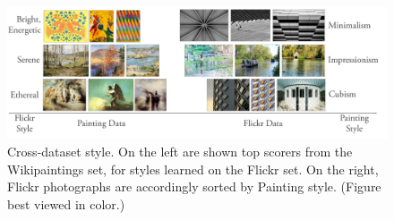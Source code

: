 \begin{figure}[ht]
\centering
\includegraphics[width=.95\linewidth]{../style/figures/style_by_style.pdf}
\caption[Cross-dataset understanding of style demonstrated by applying Wikipaintings-learned classifiers to phoitographs, and Flickr-learned classifiers to paintings.]{
    Cross-dataset style.
    On the left are shown top scorers from the Wikipaintings set, for styles learned on the Flickr set.
    On the right, Flickr photographs are accordingly sorted by Painting style.
    (Figure best viewed in color.)
}
\label{fig:photo_painting}
\end{figure}

